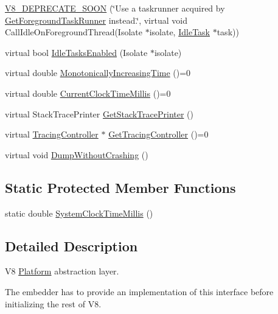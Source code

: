 \begin{DoxyCompactItemize}
\item 
\mbox{\hyperlink{classv8_1_1Platform_a2164bf101f39010ec95e117a69a4e782}{V8\+\_\+\+D\+E\+P\+R\+E\+C\+A\+T\+E\+\_\+\+S\+O\+ON}} (\char`\"{}Use a taskrunner acquired by \mbox{\hyperlink{classv8_1_1Platform_af0d18c6bbefa133c5d11ec8a460d0278}{Get\+Foreground\+Task\+Runner}} instead.\char`\"{}, virtual void Call\+Idle\+On\+Foreground\+Thread(Isolate $\ast$isolate, \mbox{\hyperlink{classv8_1_1IdleTask}{Idle\+Task}} $\ast$task))
\item 
virtual bool \mbox{\hyperlink{classv8_1_1Platform_ad229642bf16a066d2e8d866dc128141e}{Idle\+Tasks\+Enabled}} (Isolate $\ast$isolate)
\item 
virtual double \mbox{\hyperlink{classv8_1_1Platform_a6d4d7c2dcf6b0c7113099b97fa7f57b7}{Monotonically\+Increasing\+Time}} ()=0
\item 
virtual double \mbox{\hyperlink{classv8_1_1Platform_a8aa46c7f8e492351ebe1bc8168ec9c2f}{Current\+Clock\+Time\+Millis}} ()=0
\item 
virtual Stack\+Trace\+Printer \mbox{\hyperlink{classv8_1_1Platform_aadb2594e6ff9a6f6a0657412ff5a7206}{Get\+Stack\+Trace\+Printer}} ()
\item 
virtual \mbox{\hyperlink{classv8_1_1TracingController}{Tracing\+Controller}} $\ast$ \mbox{\hyperlink{classv8_1_1Platform_aa760c7bf8c46495eb650d2be72399747}{Get\+Tracing\+Controller}} ()=0
\item 
virtual void \mbox{\hyperlink{classv8_1_1Platform_abcbf846fdfc791569f64de675d522cac}{Dump\+Without\+Crashing}} ()
\end{DoxyCompactItemize}
\subsection*{Static Protected Member Functions}
\begin{DoxyCompactItemize}
\item 
static double \mbox{\hyperlink{classv8_1_1Platform_a18ccdaf3a1a738bd4082dbbe749d026b}{System\+Clock\+Time\+Millis}} ()
\end{DoxyCompactItemize}


\subsection{Detailed Description}
V8 \mbox{\hyperlink{classv8_1_1Platform}{Platform}} abstraction layer.

The embedder has to provide an implementation of this interface before initializing the rest of V8. 

